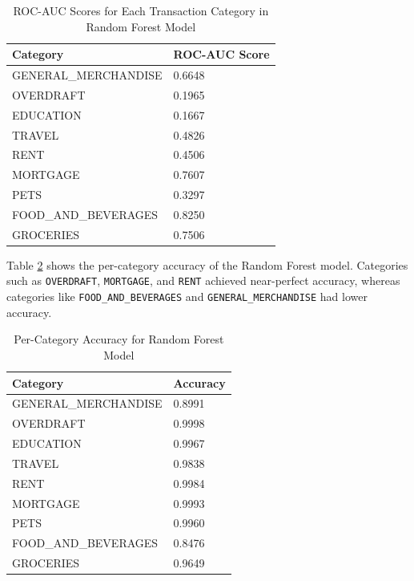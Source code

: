 \documentclass[12pt,letterpaper]{article}
\begin{document}
\begin{table}[h]
    \centering
    \begin{tabular}{ll}
        \hline
        \textbf{Category} & \textbf{ROC-AUC Score} \\
        \hline
        GENERAL\_MERCHANDISE & 0.6648 \\
        OVERDRAFT & 0.1965 \\
        EDUCATION & 0.1667 \\
        TRAVEL & 0.4826 \\
        RENT & 0.4506 \\
        MORTGAGE & 0.7607 \\
        PETS & 0.3297 \\
        FOOD\_AND\_BEVERAGES & 0.8250 \\
        GROCERIES & 0.7506 \\
        \hline
    \end{tabular}
    \caption{ROC-AUC Scores for Each Transaction Category in Random Forest Model}
    \label{table:roc_auc_rf}
\end{table}

Table \ref{table:category_accuracy_rf} shows the per-category accuracy of the Random Forest model. Categories such as \texttt{OVERDRAFT}, \texttt{MORTGAGE}, and \texttt{RENT} achieved near-perfect accuracy, whereas categories like \texttt{FOOD\_AND\_BEVERAGES} and \texttt{GENERAL\_MERCHANDISE} had lower accuracy.

\begin{table}[h]
    \centering
    \begin{tabular}{ll}
        \hline
        \textbf{Category} & \textbf{Accuracy} \\
        \hline
        GENERAL\_MERCHANDISE & 0.8991 \\
        OVERDRAFT & 0.9998 \\
        EDUCATION & 0.9967 \\
        TRAVEL & 0.9838 \\
        RENT & 0.9984 \\
        MORTGAGE & 0.9993 \\
        PETS & 0.9960 \\
        FOOD\_AND\_BEVERAGES & 0.8476 \\
        GROCERIES & 0.9649 \\
        \hline
    \end{tabular}
    \caption{Per-Category Accuracy for Random Forest Model}
    \label{table:category_accuracy_rf}
\end{table}
\end{document}
